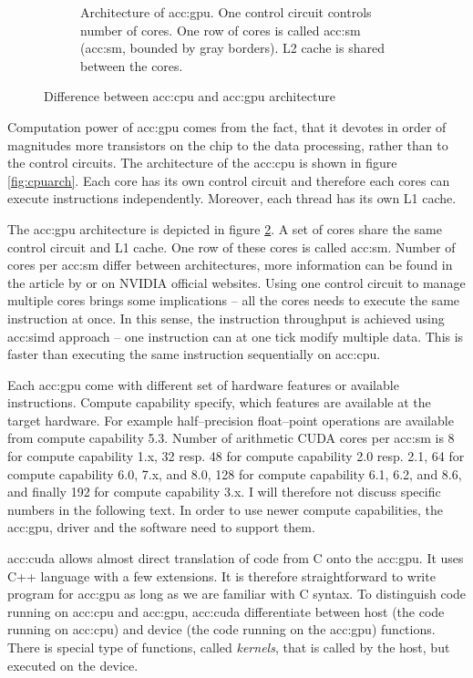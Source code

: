 \begin{figure}
\begin{subfigure}[t]{0.47\textwidth}
        \caption{Architecture of \acrshort*{acc:gpu}. One control circuit controls number of cores. One row of cores is called \acrlong{acc:sm} (\acrshort{acc:sm}, bounded by gray borders). L2 cache is shared between the cores.}
        \label{fig:gpuarch}
    \end{subfigure}
    \caption{Difference between \acrshort*{acc:cpu} and \acrshort*{acc:gpu} architecture}
\end{figure}

Computation power of \acrshort{acc:gpu} comes from the fact, that it devotes in order of magnitudes more transistors on the chip to the data processing, rather than to the control circuits. The architecture of the \acrshort{acc:cpu} is shown in figure \ref{fig:cpuarch}. Each core has its own control circuit and therefore each cores can execute instructions independently. Moreover, each thread has its own L1 cache.

The \acrshort{acc:gpu} architecture is depicted in figure \ref{fig:gpuarch}. A set of cores share the same control circuit and L1 cache. One row of these cores is called \acrfull{acc:sm}. Number of cores per \acrshort{acc:sm} differ between architectures, more information can be found in the article by \citet{NVIDIAhistory} or on NVIDIA official websites. Using one control circuit to manage multiple cores brings some implications -- all the cores needs to execute the same instruction at once. In this sense, the instruction throughput is achieved using \acrfull{acc:simd} approach -- one instruction can at one tick modify multiple data. This is faster than executing the same instruction sequentially on \acrshort{acc:cpu}.

Each \acrshort{acc:gpu} come with different set of hardware features or available instructions. Compute capability specify, which features are available at the target hardware. For example half--precision float--point operations are available from compute capability 5.3. Number of arithmetic CUDA cores per \acrshort{acc:sm} is 8 for compute capability 1.x, 32 resp. 48 for compute capability 2.0 resp. 2.1, 64 for compute capability 6.0, 7.x, and 8.0, 128 for compute capability 6.1, 6.2, and 8.6, and finally 192 for compute capability 3.x. I will therefore not discuss specific numbers in the following text. In order to use newer compute capabilities, the \acrshort{acc:gpu}, driver and the software need to support them.

\acrlong{acc:cuda} allows almost direct translation of code from C onto the \acrshort{acc:gpu}. It uses C++ language with a few extensions. It is therefore straightforward to write program for \acrshort{acc:gpu} as long as we are familiar with C syntax. To distinguish code running on \acrshort{acc:cpu} and \acrshort{acc:gpu}, \acrshort{acc:cuda} differentiate between host (the code running on \acrshort{acc:cpu}) and device (the code running on the \acrshort{acc:gpu}) functions. There is special type of functions, called \emph{kernels}, that is called by the host, but executed on the device.


